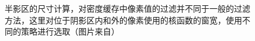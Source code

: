 \begin{figure}
\caption{半影区的尺寸计算，对密度缓存中像素值的过滤并不同于一般的过滤方法，这里对位于阴影区内和外的像素使用的核函数的窗宽，使用不同的策略进行选取（图片来自\cite{a:Implementingfastraytracedsoftshadowsinagameengine}）}
\label{f:df-ray-tracing-buffers}
\end{figure}

